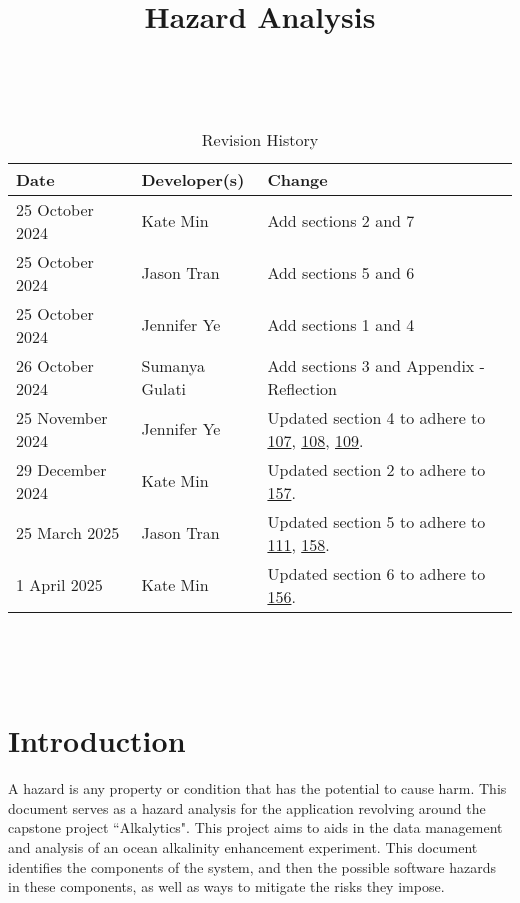 \documentclass{article}
\title{Hazard Analysis\\\progname}
\author{\authname}
\date{}
\begin{document}
\maketitle
\thispagestyle{empty}

~\newpage


\begin{table}[hp]
\caption{Revision History} \label{TblRevisionHistory}
\begin{tabularx}{\textwidth}{llX}
\toprule
\textbf{Date} & \textbf{Developer(s)} & \textbf{Change}\\
\midrule
25 October 2024 & Kate Min & Add sections 2 and 7\\
25 October 2024 & Jason Tran & Add sections 5 and 6\\
25 October 2024 & Jennifer Ye & Add sections 1 and 4\\
26 October 2024 & Sumanya Gulati & Add sections 3 and Appendix - Reflection\\
25 November 2024 & Jennifer Ye & Updated section 4 to adhere to
\href{https://github.com/SumanyaG/Alkalytics/issues/107}{107},
\href{https://github.com/SumanyaG/Alkalytics/issues/108}{108},
\href{https://github.com/SumanyaG/Alkalytics/issues/109}{109}. \\
29 December 2024 & Kate Min & Updated section 2 to adhere to
\href{https://github.com/SumanyaG/Alkalytics/issues/157}{157}. \\
25 March 2025 & Jason Tran & Updated section 5 to adhere to 
\href{https://github.com/SumanyaG/Alkalytics/issues/111}{111},
\href{https://github.com/SumanyaG/Alkalytics/issues/158}{158}. \\
1 April 2025 & Kate Min & Updated section 6 to adhere to
\href{https://github.com/SumanyaG/Alkalytics/issues/156}{156}. \\
\bottomrule
\end{tabularx}
\end{table}

~\newpage

\tableofcontents

~\newpage


\section{Introduction}

A hazard is any property or condition that has the potential to cause harm. This
document serves as a hazard analysis for the application revolving around the
capstone project ``Alkalytics". This project aims to aids in the data management
and analysis of an ocean alkalinity enhancement experiment. This document
identifies the components of the system, and then the possible software hazards
in these components, as well as ways to mitigate the risks they impose.
\end{document}
